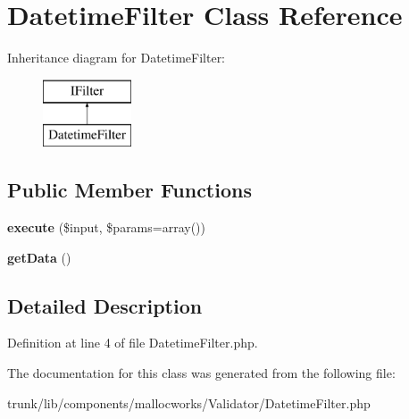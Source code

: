 \hypertarget{class_utopia_1_1_components_1_1_filter_1_1_datetime_filter}{
\section{DatetimeFilter Class Reference}
\label{class_utopia_1_1_components_1_1_filter_1_1_datetime_filter}
}
Inheritance diagram for DatetimeFilter:\begin{figure}[H]
\begin{center}
\leavevmode
\includegraphics[height=2.000000cm]{class_utopia_1_1_components_1_1_filter_1_1_datetime_filter}
\end{center}
\end{figure}
\subsection*{Public Member Functions}
\begin{DoxyCompactItemize}
\item 
\hypertarget{class_utopia_1_1_components_1_1_filter_1_1_datetime_filter_ad90dcfe8ce8e387875a2d991f35ca839}{
{\bfseries execute} (\$input, \$params=array())}
\label{class_utopia_1_1_components_1_1_filter_1_1_datetime_filter_ad90dcfe8ce8e387875a2d991f35ca839}

\item 
\hypertarget{class_utopia_1_1_components_1_1_filter_1_1_datetime_filter_a81a67162a6288d78fc4c55283325f0b4}{
{\bfseries getData} ()}
\label{class_utopia_1_1_components_1_1_filter_1_1_datetime_filter_a81a67162a6288d78fc4c55283325f0b4}

\end{DoxyCompactItemize}


\subsection{Detailed Description}


Definition at line 4 of file DatetimeFilter.php.



The documentation for this class was generated from the following file:\begin{DoxyCompactItemize}
\item 
trunk/lib/components/mallocworks/Validator/DatetimeFilter.php\end{DoxyCompactItemize}
